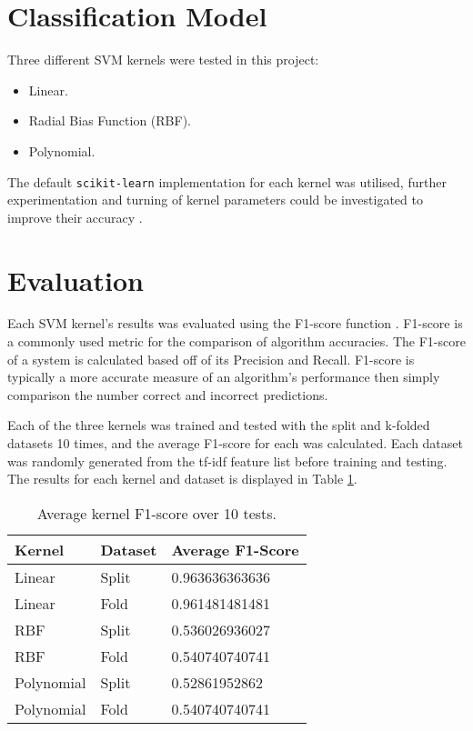 \documentclass[twocolumn]{article}
\begin{document}
\section{Classification Model}
Three different SVM kernels were tested in this project:

\begin{itemize}
    \item Linear.
    \item Radial Bias Function (RBF).
    \item Polynomial.
\end{itemize}
The default {\tt scikit-learn} implementation for each kernel was utilised,
further experimentation and turning of kernel parameters could be investigated
to improve their accuracy \cite{svm,kernel}.


\section{Evaluation}
Each SVM kernel's results was evaluated using the F1-score function
\cite{f1score}.  
F1-score is a commonly used metric for the comparison of
algorithm accuracies.
The F1-score of a system is calculated based off of its Precision and
Recall.
F1-score is typically a more accurate measure of an algorithm's performance
then simply comparison the number correct and incorrect predictions.

Each of the three kernels was trained and tested with the split and k-folded
datasets 10 times, and the average F1-score for each was calculated. 
Each dataset was randomly generated from the tf-idf feature list before
training and testing.
The results for each kernel and dataset is displayed in Table \ref{table_res}.

\begin{table}[]
    \centering
        \begin{tabular}{|l|l|l|}
        \hline
        \textbf{Kernel} & \textbf{Dataset} & \textbf{Average F1-Score} \\ \hline
        Linear          & Split            & 0.963636363636            \\ \hline
        Linear          & Fold             & 0.961481481481            \\ \hline
        RBF             & Split            & 0.536026936027            \\ \hline
        RBF             & Fold             & 0.540740740741            \\ \hline
        Polynomial      & Split            & 0.52861952862             \\ \hline
        Polynomial      & Fold             & 0.540740740741            \\ \hline
        \end{tabular}
    \caption{Average kernel F1-score over 10 tests.}
    \label{table_res}
\end{table}
\end{document}

